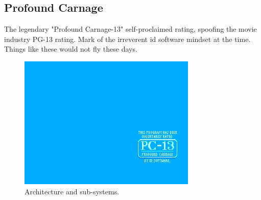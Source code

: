 \documentclass[book.tex]{subfiles}
\begin{document}
\subsection{Profound Carnage}
The legendary "Profound Carnage-13" self-proclaimed rating, spoofing the movie industry PG-13 rating. Mark of the irreverent id software mindset at the time. Things like these would not fly these days.
\begin{figure}[H]
\centering
\includegraphics[width=\textwidth]{imgs/pg13.png}
\caption{Architecture and sub-systems.}
\end{figure}
\end{document}
